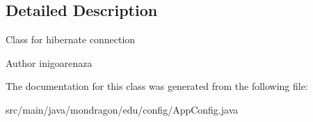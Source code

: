 \subsection{Detailed Description}
Class for hibernate connection

\begin{DoxyAuthor}{Author}
inigoarenaza 
\end{DoxyAuthor}


The documentation for this class was generated from the following file\+:\begin{DoxyCompactItemize}
\item 
src/main/java/mondragon/edu/config/App\+Config.\+java\end{DoxyCompactItemize}
